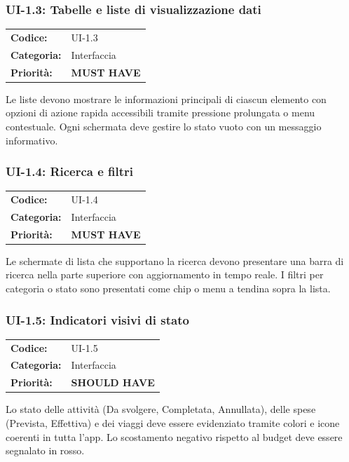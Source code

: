 \documentclass[12pt, a4paper]{article}
\newcommand{\MUST}{\colorbox{musthave}{\small\textbf{MUST HAVE}}}
\newcommand{\SHOULD}{\colorbox{shouldhave}{\small\textbf{SHOULD HAVE}}}
\begin{document}
\subsubsection{UI-1.3: Tabelle e liste di visualizzazione dati}

\begin{tabular}{@{}ll@{}}
  \toprule
  \textbf{Codice:}    & UI-1.3 \\
  \textbf{Categoria:} & Interfaccia \\
  \textbf{Priorità:}  & \MUST \\
  \bottomrule
\end{tabular}

\medskip
\noindent
Le liste devono mostrare le informazioni principali di ciascun elemento con opzioni
di azione rapida accessibili tramite pressione prolungata o menu contestuale. Ogni
schermata deve gestire lo stato vuoto con un messaggio informativo.

\subsubsection{UI-1.4: Ricerca e filtri}

\begin{tabular}{@{}ll@{}}
  \toprule
  \textbf{Codice:}    & UI-1.4 \\
  \textbf{Categoria:} & Interfaccia \\
  \textbf{Priorità:}  & \MUST \\
  \bottomrule
\end{tabular}

\medskip
\noindent
Le schermate di lista che supportano la ricerca devono presentare una barra di ricerca
nella parte superiore con aggiornamento in tempo reale. I filtri per categoria o stato
sono presentati come chip o menu a tendina sopra la lista.

\subsubsection{UI-1.5: Indicatori visivi di stato}

\begin{tabular}{@{}ll@{}}
  \toprule
  \textbf{Codice:}    & UI-1.5 \\
  \textbf{Categoria:} & Interfaccia \\
  \textbf{Priorità:}  & \SHOULD \\
  \bottomrule
\end{tabular}

\medskip
\noindent
Lo stato delle attività (Da svolgere, Completata, Annullata), delle spese (Prevista,
Effettiva) e dei viaggi deve essere evidenziato tramite colori e icone coerenti in
tutta l'app. Lo scostamento negativo rispetto al budget deve essere segnalato in rosso.
\end{document}
